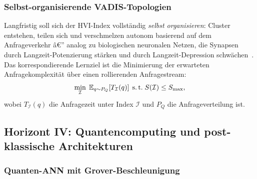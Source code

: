 ﻿\documentclass[12pt,a4paper]{article}
\begin{document}
\subsubsection{Selbst-organisierende VADIS-Topologien}

Langfristig soll sich der HVI-Index vollständig
\emph{selbst organisieren}: Cluster entstehen, teilen sich
und verschmelzen autonom basierend auf dem Anfrageverkehr â€”
analog zu biologischen neuronalen Netzen, die Synapsen
durch Langzeit-Potenzierung stärken und durch
Langzeit-Depression schwächen~\cite{bliss1993synaptic}.
Das korrespondierende Lernziel ist die Minimierung der
erwarteten Anfragekomplexität über einen rollierenden
Anfragestream:
\begin{equation}
  \min_{\mathcal{I}} \;\mathbb{E}_{q \sim P_Q}\!\left[
    T_{\mathcal{I}}(q)
  \right]
  \;\text{s.\,t.}\; S(\mathcal{I}) \leq S_{\max},
\end{equation}
wobei $T_{\mathcal{I}}(q)$ die Anfragezeit unter Index
$\mathcal{I}$ und $P_Q$ die Anfrageverteilung ist.

\subsection{Horizont IV: Quantencomputing und
            post-klassische Architekturen}
\label{sub:horizont4}

\subsubsection{Quanten-ANN mit Grover-Beschleunigung}
\end{document}
